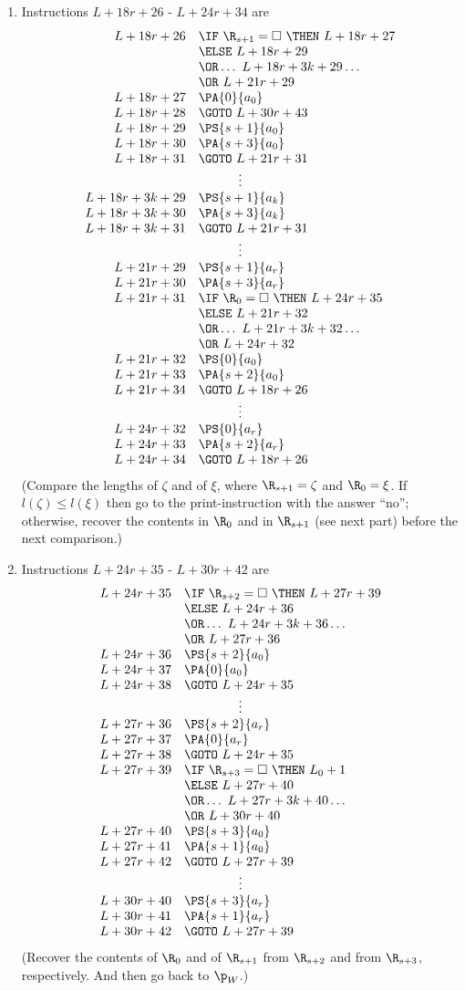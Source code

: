 \begin{enumerate}[1.]
\begin{enumerate}[(1)]
\item Instructions $L + 18r + 26$ - $L + 24r + 34$ are
\[
\begin{array}{rl}
L + 18r + 26 & \IF \ \R_{s + 1} = \Box \ \THEN \ L + 18r + 27 \cr
\ & \ELSE \ L + 18r + 29 \cr
\ & \OR \ldots \ L + 18r + 3k + 29 \ldots \cr
\ & \OR \ L + 21r + 29 \cr
L + 18r + 27 & \PA{0}{a_0} \cr
L + 18r + 28 & \GOTO \ L + 30r + 43 \cr
L + 18r + 29 & \PS{s + 1}{a_0} \cr
L + 18r + 30 & \PA{s + 3}{a_0} \cr
L + 18r + 31 & \GOTO \ L + 21r + 31 \cr
\multicolumn{2}{c}{\vdots} \cr
L + 18r + 3k + 29 & \PS{s + 1}{a_k} \cr
L + 18r + 3k + 30 & \PA{s + 3}{a_k} \cr
L + 18r + 3k + 31 & \GOTO \ L + 21r + 31 \cr
\multicolumn{2}{c}{\vdots} \cr
L + 21r + 29 & \PS{s + 1}{a_r} \cr
L + 21r + 30 & \PA{s + 3}{a_r} \cr
L + 21r + 31 & \IF \ \R_0 = \Box \ \THEN \ L + 24r + 35 \cr
\ & \ELSE \ L + 21r + 32 \cr
\ & \OR \ldots \  L + 21r + 3k + 32 \ldots \cr
\ & \OR \ L + 24r + 32 \cr
L + 21r + 32 & \PS{0}{a_0} \cr
L + 21r + 33 & \PA{s + 2}{a_0} \cr
L + 21r + 34 & \GOTO \ L + 18r + 26 \cr
\multicolumn{2}{c}{\vdots} \cr
L + 24r + 32 & \PS{0}{a_r} \cr
L + 24r + 33 & \PA{s + 2}{a_r} \cr
L + 24r + 34 & \GOTO \ L + 18r + 26 \cr
\end{array}
\]
(Compare the lengths of $\zeta$ and of $\xi$, where $\R_{s + 1} = \zeta$ and $\R_0 = \xi$. If $l(\zeta) \leq l(\xi)$ then go to the print-instruction with the answer ``no''; otherwise, recover the contents in $\R_0$ and in $\R_{s + 1}$ (see next part) before the next comparison.)
\item Instructions $L + 24r + 35$ - $L + 30r + 42$ are
\[
\begin{array}{rl}
L + 24r + 35 & \IF \ \R_{s + 2} = \Box \ \THEN \ L + 27r + 39 \cr
\ & \ELSE \ L + 24r + 36 \cr
\ & \OR \ldots \ L + 24r + 3k + 36 \ldots \cr
\ & \OR \ L + 27r + 36 \cr
L + 24r + 36 & \PS{s + 2}{a_0} \cr
L + 24r + 37 & \PA{0}{a_0} \cr
L + 24r + 38 & \GOTO \ L + 24r + 35 \cr
\multicolumn{2}{c}{\vdots} \cr
L + 27r + 36 & \PS{s + 2}{a_r} \cr
L + 27r + 37 & \PA{0}{a_r} \cr
L + 27r + 38 & \GOTO \ L + 24r + 35 \cr
L + 27r + 39 & \IF \ \R_{s + 3} = \Box \ \THEN \ L_0 + 1 \cr
\ & \ELSE \ L + 27r + 40 \cr
\ & \OR \ldots \ L + 27r + 3k + 40 \ldots \cr
\ & \OR \ L + 30r + 40 \cr
L + 27r + 40 & \PS{s + 3}{a_0} \cr
L + 27r + 41 & \PA{s + 1}{a_0} \cr
L + 27r + 42 & \GOTO \ L + 27r + 39 \cr
\multicolumn{2}{c}{\vdots} \cr
L + 30r + 40 & \PS{s + 3}{a_r} \cr
L + 30r + 41 & \PA{s + 1}{a_r} \cr
L + 30r + 42 & \GOTO \ L + 27r + 39 \cr
\end{array}
\]
(Recover the contents of $\R_0$ and of $\R_{s + 1}$ from $\R_{s + 2}$ and from $\R_{s + 3}$, respectively. And then go back to $\p_W$.)

\end{enumerate}
\end{enumerate}
